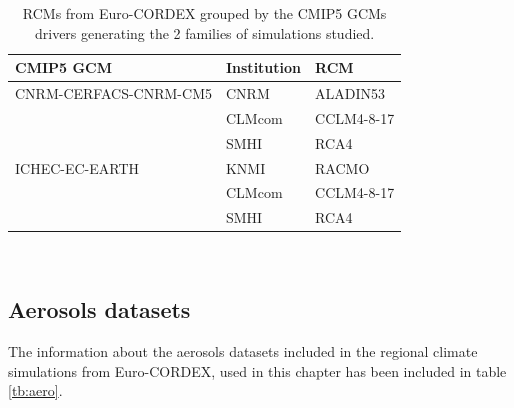 \begin{table}[h]
\caption[RCMs from Euro-CORDEX grouped by the CMIP5 GCMs drivers generating the 2 families of simulations studied]{\label{tb:families}RCMs from Euro-CORDEX grouped by the CMIP5 GCMs drivers generating the 2 families of simulations studied.}
\footnotesize
\begin{tabular}{>{\raggedrigth}m{4.5cm}>{\raggedright}m{3cm}>{\raggedright}m{3cm}}
\toprule 
CMIP5 GCM & Institution  & RCM  \tabularnewline
\midrule
CNRM-CERFACS-CNRM-CM5 & CNRM & ALADIN53 \tabularnewline
&CLMcom&CCLM4-8-17\tabularnewline 
&SMHI&RCA4\tabularnewline
\midrule  
ICHEC-EC-EARTH&KNMI&RACMO\tabularnewline
&CLMcom&CCLM4-8-17\tabularnewline
&SMHI&RCA4\tabularnewline
\bottomrule
\end{tabular}\\
\end{table}
\normalsize



\subsection{Aerosols datasets}


The information about the aerosols datasets included in the regional climate simulations from Euro-CORDEX, used in this chapter has been included in table \ref{tb:aero}. %


